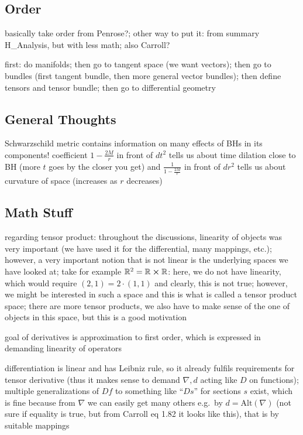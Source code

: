 		\subsection{Order}
basically take order from Penrose?; other way to put it: from summary H\_Analysis, but with less math; also Carroll?



first: do manifolds; then go to tangent space (we want vectors); then go to bundles (first tangent bundle, then more general vector bundles); then define tensors and tensor bundle; then go to differential geometry



	\subsection{General Thoughts}
Schwarzschild metric contains information on many effects of BHs in its components! coefficient $1 - \frac{2 M}{r}$ in front of $dt^2$ tells us about time dilation close to BH (more $t$ goes by the closer you get) and $\frac{1}{1 - \frac{2 M}{r}}$ in front of $dr^2$ tells us about curvature of space (increases as $r$ decreases)



		\subsection{Math Stuff}
regarding tensor product: throughout the discussions, linearity of objects was very important (we have used it for the differential, many mappings, etc.); however, a very important notion that is not linear is the underlying spaces we have looked at; take for example $\mathbb{R}^2 = \mathbb{R} \cross \mathbb{R}$: here, we do not have linearity, which would require $(2, 1) = 2 \cdot (1, 1)$ and clearly, this is not true; however, we might be interested in such a space and this is what is called a tensor product space; there are more tensor products, we also have to make sense of the one of objects in this space, but this is a good motivation


goal of derivatives is approximation to first order, which is expressed in demanding linearity of operators


differentiation is linear and has Leibniz rule, so it already fulfils requirements for tensor derivative (thus it makes sense to demand $\nabla, d$ acting like $D$ on functions); multiple generalizations of $Df$ to something like \enquote{$Ds$} for sections $s$ exist, which is fine because from $\nabla$ we can easily get many others e.g.~by $d = \text{Alt}(\nabla)$ (not sure if equality is true, but from Carroll eq 1.82 it looks like this), that is by suitable mappings



